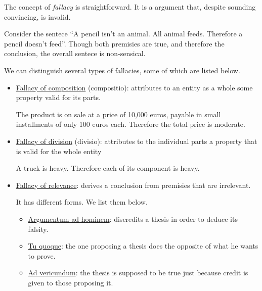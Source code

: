 \documentclass{subfiles}
\begin{document}
    The concept of \emph{fallacy} is straightforward.
        It is a argument that, despite sounding convincing, is invalid.

    \begin{example*}
        Consider the sentece ``A pencil isn't an animal. All animal feeds. 
            Therefore a pencil doesn't feed''.
            Though both premisies are true, and therefore the conclusion,
            the overall sentece is non-sensical.
    \end{example*}

    We can distinguish several types of fallacies, some of which are listed below.
    \begin{itemize}
        \item \underline{Fallacy of composition} (\foreignlanguage{latin}{compositio}): 
            attributes to an entity as a whole some property valid for its parts.
            \begin{quote*}             
                The product is on sale at a price of 10,000 euros, payable in small
                installments of only 100 euros each. Therefore the total price is
                moderate.
            \end{quote*}

        \item \underline{Fallacy of division} (\foreignlanguage{latin}{divisio}):
            attributes to the individual parts a property that is valid for the whole entity 
            \begin{quote*}
                A truck is heavy. Therefore each of its component is heavy.
            \end{quote*}

        \item \underline{Fallacy of relevance}:
            derives a conclusion from premisies that are irrelevant.

            It has different forms. We list them below.
            \begin{itemize}
                \item \underline{\foreignlanguage{latin}{Argumentum ad hominem}}:
                    discredits a thesis in order to deduce its falsity.

                \item \underline{\foreignlanguage{latin}{Tu quoque}}:
                    the one proposing a thesis does the opposite of what he wants to prove.

                \item \underline{\foreignlanguage{latin}{Ad vericundum}}:
                    the thesis is supposed to be true just because credit is given to those proposing it.


\end{itemize}
\end{itemize}
\end{document}
